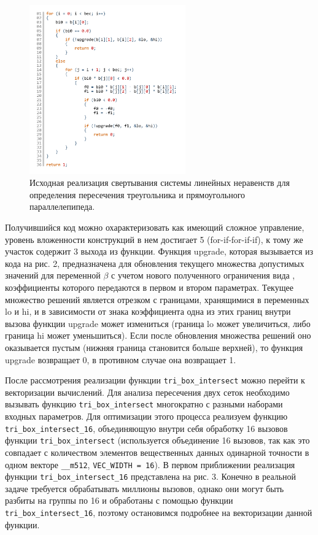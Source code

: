 \begin{figure}[ht]
	\centering
		\includegraphics[width=0.6\textwidth]{./pics/text_4_mesh_intersect/pic_tri_intersect_orig.pdf}
	\caption{Исходная реализация свертывания системы линейных неравенств для определения пересечения треугольника и прямоугольного параллелепипеда.}
	\label{fig:text_1_mesh_intersect_tri}
\end{figure}

Получившийся код можно охарактеризовать как имеющий сложное управление, уровень вложенности конструкций в нем достигает 5 (for-if-for-if-if), к тому же участок содержит 3 выхода из функции.
Функция upgrade, которая вызывается из кода на рис. 2, предназначена для обновления текущего множества допустимых значений для переменной $\beta$ с учетом нового полученного ограничения вида  , коэффициенты которого передаются в первом и втором параметрах.
Текущее множество решений является отрезком с границами, хранящимися в переменных lo и hi, и в зависимости от знака коэффициента   одна из этих границ внутри вызова функции upgrade может измениться (граница lo может увеличиться, либо граница hi может уменьшиться).
Если после обновления множества решений оно оказывается пустым (нижняя граница становится больше верхней), то функция upgrade возвращает 0, в противном случае она возвращает 1.

После рассмотрения реализации функции \texttt{tri\_box\_intersect} можно перейти к векторизации вычислений.
Для анализа пересечения двух сеток необходимо вызывать функцию \texttt{tri\_box\_intersect} многократно с разными наборами входных параметров.
Для оптимизации этого процесса реализуем функцию \texttt{tri\_box\_intersect\_16}, объединяющую внутри себя обработку 16 вызовов функции \texttt{tri\_box\_intersect} (используется объединение 16 вызовов, так как это совпадает с количеством элементов вещественных данных одинарной точности в одном векторе \texttt{\_\_m512}, \texttt{VEC\_WIDTH = 16}).
В первом приближении реализация функции \texttt{tri\_box\_intersect\_16} представлена на рис. 3. Конечно в реальной задаче требуется обрабатывать миллионы вызовов, однако они могут быть разбиты на группы по 16 и обработаны с помощью функции \texttt{tri\_box\_intersect\_16}, поэтому остановимся подробнее на векторизации данной функции.

